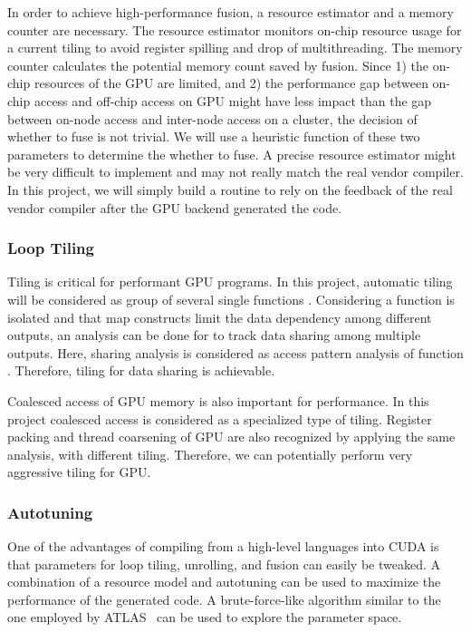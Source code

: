 In order to achieve high-performance fusion, a resource estimator and a
memory counter are necessary. The resource estimator monitors on-chip
resource usage for a current tiling to avoid register spilling and drop
of multithreading. The memory counter calculates the potential
memory count saved by fusion. Since 1) the on-chip resources of the GPU are
limited, and 2) the performance gap between on-chip access and off-chip
access on GPU might have less impact than the gap between on-node access
and inter-node access on a cluster, the decision of whether to fuse is not
trivial. We will use a heuristic function of these two parameters to
determine the whether to fuse. A precise resource estimator might be
very difficult to implement and may not really match the real vendor
compiler. In this project, we will simply build a routine to rely on the
feedback of the real vendor compiler after the GPU backend generated the
code.

\subsubsection{Loop Tiling}\label{loop-tiling}

Tiling is critical for performant GPU programs. In this project,
automatic tiling will be considered as group of several single functions
. Considering a function  is isolated and that map constructs
limit the data dependency among different outputs, an analysis can be done for
 to track data sharing among multiple outputs. Here,
sharing analysis is considered as access pattern analysis of function
. Therefore, tiling for data sharing is achievable.

Coalesced access of GPU memory is also important for performance. In this
project coalesced access is considered as a specialized type of
tiling. Register packing and thread coarsening of GPU are also
recognized by applying the same analysis, with different tiling.
Therefore, we can potentially perform very aggressive tiling for GPU.

\subsubsection{Autotuning}\label{autotuning}

One of the advantages of compiling from a high-level languages into CUDA
is that parameters for loop tiling, unrolling, and fusion can easily be tweaked.
A combination of a resource model and autotuning can be used to
maximize the performance of the generated code. A brute-force-like
algorithm similar to the one employed by ATLAS~\cite{atlas} can be used to
explore the parameter space.
